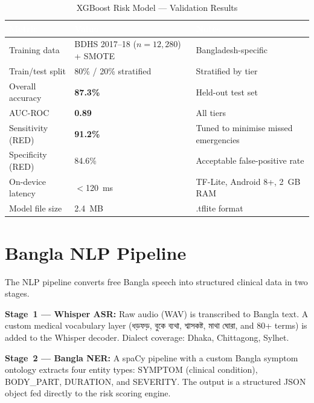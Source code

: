 \documentclass[12pt, a4paper]{article}
\newcommand{\bn}[1]{{\bengalifont #1}}
\begin{document}
\begin{table}[H]
\centering
\caption{XGBoost Risk Model — Validation Results}
\small
\begin{tabularx}{\linewidth}{@{}lXl@{}}
\toprule
\rowcolor{navycolor}
\textcolor{white}{\textbf{Metric}} &
\textcolor{white}{\textbf{Value}} &
\textcolor{white}{\textbf{Notes}} \\
\midrule
Training data      & BDHS 2017--18 ($n{=}12{,}280$) + SMOTE & Bangladesh-specific \\
\rowcolor{gray10}
Train/test split   & 80\% / 20\% stratified                 & Stratified by tier \\
Overall accuracy   & \textbf{87.3\%}                         & Held-out test set \\
\rowcolor{gray10}
AUC-ROC            & \textbf{0.89}                           & All tiers \\
Sensitivity (RED)  & \textbf{91.2\%}                         & Tuned to minimise missed emergencies \\
\rowcolor{gray10}
Specificity (RED)  & 84.6\%                                  & Acceptable false-positive rate \\
On-device latency  & $<$120~ms                               & TF-Lite, Android 8+, 2~GB RAM \\
\rowcolor{gray10}
Model file size    & 2.4~MB                                  & .tflite format \\
\bottomrule
\end{tabularx}
\end{table}

\section{Bangla NLP Pipeline}

The NLP pipeline converts free Bangla speech into structured clinical data in two stages.

\noindent\textbf{Stage~1 — Whisper ASR:} Raw audio (WAV) is transcribed to Bangla text. A custom medical vocabulary layer (\bn{ধড়ফড়, বুকে ব্যথা, শ্বাসকষ্ট, মাথা ঘোরা,} and 80+ terms) is added to the Whisper decoder. Dialect coverage: Dhaka, Chittagong, Sylhet.

\noindent\textbf{Stage~2 — Bangla NER:} A spaCy pipeline with a custom Bangla symptom ontology extracts four entity types: SYMPTOM (clinical condition), BODY\_PART, DURATION, and SEVERITY. The output is a structured JSON object fed directly to the risk scoring engine.
\end{document}
